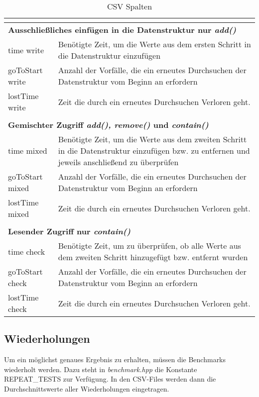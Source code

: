 \begin{table}[H]
\begin{tabular}{ |m{2.5cm}|  m{13cm}| }
	 \multicolumn{2}{l}{} \\ \hline
	 \multicolumn{2}{|l|}{\textbf{Ausschließliches einfügen in die Datenstruktur nur \textit{add()}}}    \\ \hline
	 time write& 	Benötigte Zeit, um die Werte aus dem ersten Schritt in die Datenstruktur einzufügen\\ \hline
	 goToStart write& Anzahl der Vorfälle, die ein erneutes Durchsuchen der Datenstruktur vom Beginn an erfordern\\ \hline
	 lostTime write&  Zeit die durch ein erneutes Durchsuchen Verloren geht.\\ \hline
	 \multicolumn{2}{l}{} \\ \hline
	 \multicolumn{2}{|l|}{\textbf{Gemischter Zugriff \textit{add(), remove()} und \textit{contain()}}}    \\ \hline
	 time mixed& 	Benötigte Zeit, um die Werte aus dem zweiten Schritt in die Datenstruktur einzufügen 
	 				bzw. zu entfernen und jeweils anschließend zu überprüfen\\ \hline
	 goToStart mixed& Anzahl der Vorfälle, die ein erneutes Durchsuchen der Datenstruktur vom Beginn an erfordern\\ \hline
	 lostTime mixed& Zeit die durch ein erneutes Durchsuchen Verloren geht.\\ \hline
	 \multicolumn{2}{l}{} \\ \hline
	 \multicolumn{2}{|l|}{\textbf{Lesender Zugriff nur \textit{contain()}}}    \\ \hline
	 time check& Benötigte Zeit, um zu überprüfen, ob alle Werte aus dem zweiten Schritt hinzugefügt bzw. entfernt wurden \\ \hline
	 goToStart check& Anzahl der Vorfälle, die ein erneutes Durchsuchen der Datenstruktur vom Beginn an erfordern\\ \hline
	 lostTime check& Zeit die durch ein erneutes Durchsuchen Verloren geht.\\ \hline
	\end{tabular} 
	\caption{CSV Spalten}
	\label{tab:csv}
	\end{table}

\subsection{Wiederholungen}
Um ein möglichst genaues Ergebnis zu erhalten, müssen die Benchmarks wiederholt werden. Dazu steht in \textit{benchmark.hpp}
die Konstante REPEAT\_TESTS zur Verfügung. In den CSV-Files werden dann die Durchschnittswerte aller Wiederholungen eingetragen.